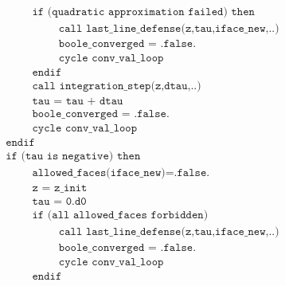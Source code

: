 \documentclass[./main.tex]{subfiles}
\begin{document}
\begin{align*}
&\hspace{3cm} \texttt{if (quadratic approximation failed) then}\nonumber\\
&\hspace{4cm} \texttt{call last\_line\_defense(z,tau,iface\_new,..)}\nonumber\\
&\hspace{4cm} \texttt{boole\_converged = .false.}\nonumber\\
&\hspace{4cm} \texttt{cycle conv\_val\_loop}\nonumber\\
&\hspace{3cm} \texttt{endif}\nonumber\\
&\hspace{3cm} \texttt{call integration\_step(z,dtau,..)}\nonumber\\
&\hspace{3cm} \texttt{tau = tau + dtau}\nonumber\\
&\hspace{3cm} \texttt{boole\_converged = .false.}\nonumber\\
&\hspace{3cm} \texttt{cycle conv\_val\_loop}\nonumber\\
&\hspace{2cm} \texttt{endif}\nonumber\\
&\hspace{2cm} \texttt{if (tau is negative) then}\nonumber\\
&\hspace{3cm} \texttt{allowed\_faces(iface\_new)=.false.}\nonumber\\
&\hspace{3cm} \texttt{z = z\_init}\nonumber\\
&\hspace{3cm} \texttt{tau = 0.d0}\nonumber\\
&\hspace{3cm} \texttt{if (all allowed\_faces forbidden)}\nonumber\\
&\hspace{4cm} \texttt{call last\_line\_defense(z,tau,iface\_new,..)}\nonumber\\
&\hspace{4cm} \texttt{boole\_converged = .false.}\nonumber\\
&\hspace{4cm} \texttt{cycle conv\_val\_loop}\nonumber\\
&\hspace{3cm} \texttt{endif}\nonumber\\

\end{align*}
\end{document}
